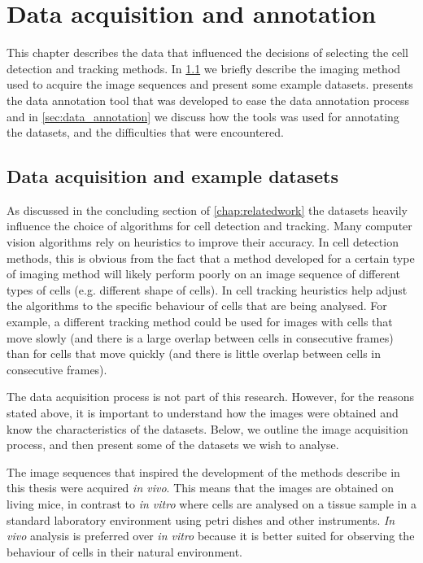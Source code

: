 \chapter{Data acquisition and annotation }
	\label{chap:data}
	
	This chapter describes the data that influenced the decisions of selecting the cell detection and tracking methods. In \cref{sec:data_examples} we briefly describe the imaging method used to acquire the image sequences and present some example datasets.  presents the data annotation tool that was developed to ease the data annotation process and in \cref{sec:data_annotation} we discuss how the tools was used for annotating the datasets, and the difficulties that were encountered.

    \section{Data acquisition and example datasets }
    \label{sec:data_examples}
    
    As discussed in the concluding section of \cref{chap:relatedwork} the datasets heavily influence the choice of algorithms for cell detection and tracking. Many computer vision algorithms rely on heuristics to improve their accuracy. In cell detection methods, this is obvious from the fact that a method developed for a certain type of imaging method will likely perform poorly on an image sequence of different types of cells (e.g. different shape of cells). In cell tracking heuristics help adjust the algorithms to the specific behaviour of cells that are being analysed. For example, a different tracking method could be used for images with cells that move slowly (and there is a large overlap between cells in consecutive frames) than for cells that move quickly (and there is little overlap between cells in consecutive frames).
    
    The data acquisition process is not part of this research. However, for the reasons stated above, it is important to understand how the images were obtained and know the characteristics of the datasets. Below, we outline the image acquisition process, and then present some of the datasets we wish to analyse.
    
    The image sequences that inspired the development of the methods describe in this thesis were acquired \textit{in vivo}. This means that the images are obtained on living mice, in contrast to \textit{in vitro} where cells are analysed on a tissue sample in a standard laboratory environment using petri dishes and other instruments. \textit{In vivo} analysis is preferred over \textit{in vitro} because it is better suited for observing the behaviour of cells in their natural environment.
    
